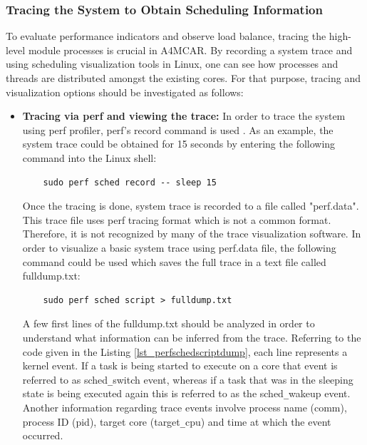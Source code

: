 \subsubsection{Tracing the System to Obtain Scheduling Information}
To evaluate performance indicators and observe load balance, tracing the high-level module processes is crucial in A4MCAR. By recording a system trace and using scheduling visualization tools in Linux, one can see how processes and threads are distributed amongst the existing cores. For that purpose, tracing and visualization options should be investigated as follows:
\begin{itemize}
	\item \textbf{Tracing via perf and viewing the trace:}
	In order to trace the system using perf profiler, perf's record command is used \cite{perf2}. As an example, the system trace could be obtained for 15 seconds by entering the following command into the Linux shell:
	\begin{lstlisting}
	sudo perf sched record -- sleep 15
	\end{lstlisting}
	Once the tracing is done, system trace is recorded to a file called "perf.data". This trace file uses perf tracing format which is not a common format. Therefore, it is not recognized by many of the trace visualization software. In order to visualize a basic system trace using perf.data file, the following command could be used which saves the full trace in a text file called fulldump.txt:
	\begin{lstlisting}
	sudo perf sched script > fulldump.txt
	\end{lstlisting}
	A few first lines of the fulldump.txt should be analyzed in order to understand what information can be inferred from the trace. Referring to the code given in the Listing \ref{lst_perfschedscriptdump}, each line represents a kernel event. If a task is being started to execute on a core that event is referred to as sched\texttt{\_}switch event, whereas if a task that was in the sleeping state is being executed again this is referred to as the sched\texttt{\_}wakeup event. Another information regarding trace events involve process name (comm), process ID (pid), target core (target\texttt{\_}cpu) and time at which the event occurred. 
	
	
	
	

\end{itemize}
